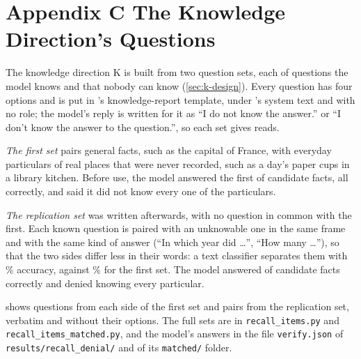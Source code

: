 \chapter*{Appendix C \quad The Knowledge Direction's Questions}
\label{app:questions}

The knowledge direction K is built from two question sets, each of  questions the model
knows and  that nobody can know (\cref{sec:k-design}). Every question has four options
and is put in \hpkr's knowledge-report template, under \hpkr's system text and with no role; the
model's reply is written for it as ``I do not know the answer.'' or ``I don't know the answer to the
question.'', so each set gives  reads.

\emph{The first set} pairs general facts, such as the capital of France, with everyday particulars of
real places that were never recorded, such as a day's paper cups in a library kitchen. Before use, the
model answered the first  of  candidate facts, all correctly,
and said it did not know every one of the  particulars.

\emph{The replication set} was written afterwards, with no question in common with the first. Each
known question is paired with an unknowable one in the same frame and with the same kind of answer
(``In which year did \ldots'', ``How many \ldots''), so that the two sides differ less in their words:
a text classifier separates them with \% accuracy, against
\% for the first set. The model answered  of
 candidate facts correctly and denied knowing every particular.

 shows  questions from each side of the first set and
 pairs from the replication set, verbatim and without their options. The full
sets are in \texttt{recall\_items.py} and \texttt{recall\_items\_matched.py}, and the model's answers
in the file \texttt{verify.json} of \texttt{results/\allowbreak recall\_denial/} and of its
\texttt{matched/} folder.

\begin{table}[h]
\centering
\small
\caption{Questions from K's two sets, verbatim.}
\label{tab:k-questions}

\end{table}
